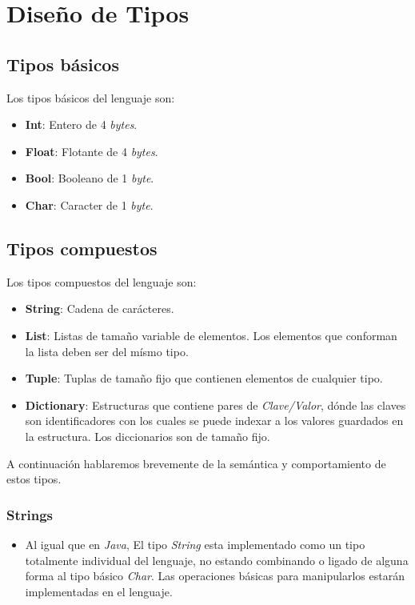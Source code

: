 \documentclass[12pt, spanish]{report}
\begin{document}
\section{Dise\~no de Tipos}
\label{sec:tipos}

\subsection{Tipos b\'asicos}
\label{sec:tiposbasicos}

Los tipos b\'asicos del lenguaje son:

\begin{itemize}
\item \textbf{Int}: Entero de 4 \emph{bytes}.
\item \textbf{Float}: Flotante de 4 \emph{bytes}.
\item \textbf{Bool}: Booleano de 1 \emph{byte}.
\item \textbf{Char}: Caracter de 1 \emph{byte}.
\end{itemize}

\subsection{Tipos compuestos}
\label{sec:tiposcompuestos}

Los tipos compuestos del lenguaje son:

\begin{itemize}
\item \textbf{String}: Cadena de car\'acteres.
\item \textbf{List}: Listas de tamaño variable de elementos. Los
  elementos que conforman la lista deben ser del m\'ismo tipo.
\item \textbf{Tuple}: Tuplas de tamaño fijo que contienen elementos de
  cualquier tipo.
\item \textbf{Dictionary}: Estructuras que contiene pares de
  \emph{Clave/Valor}, d\'onde las claves son identificadores con los
  cuales se puede indexar a los valores guardados en la
  estructura. Los diccionarios son de tamaño fijo.
\end{itemize}

A continuaci\'on hablaremos brevemente de la sem\'antica y
comportamiento de estos tipos.

\subsubsection{Strings}
\label{sec:strings}
\begin{itemize}
\item Al igual que en \emph{Java}, El tipo \emph{String} esta
  implementado como un tipo totalmente individual del lenguaje, no
  estando combinando o ligado de alguna forma al tipo b\'asico
  \emph{Char}. Las operaciones b\'asicas para manipularlos estar\'an
  implementadas en el lenguaje.
\end{itemize}
\end{document}
